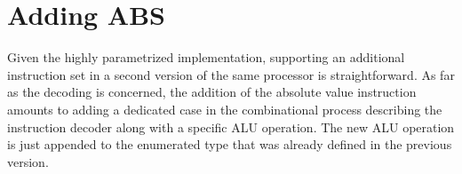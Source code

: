 \section{Adding ABS}
Given the highly parametrized implementation, supporting an additional instruction set in a second version of the same processor is straightforward. As far as the decoding is concerned, the addition of the absolute value instruction amounts to adding a dedicated case in the combinational process describing the instruction decoder along with a specific ALU operation. The new ALU operation is just appended to the enumerated type that was already defined in the previous version.